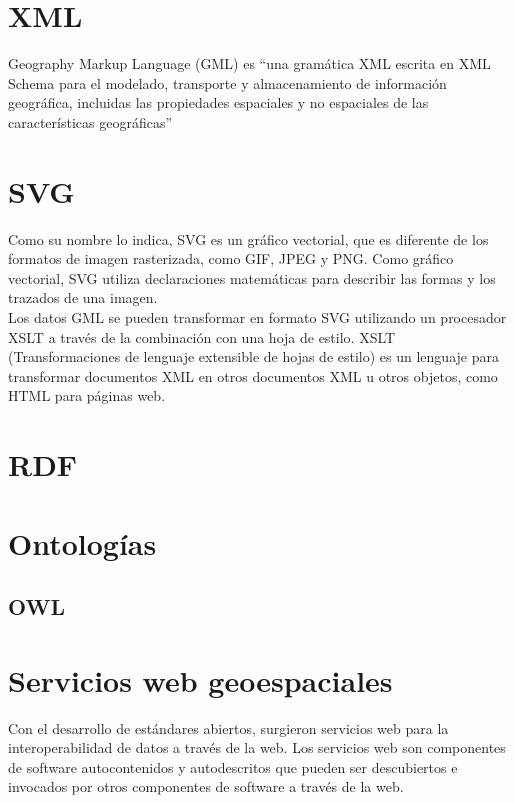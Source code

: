 \section{XML}

Geography Markup Language (GML) es “una gramática XML escrita en XML Schema para el modelado, transporte y almacenamiento de información geográfica, incluidas las propiedades espaciales y no espaciales de las características geográficas”

\section{SVG}

Como su nombre lo indica, SVG es un gráfico vectorial, que es diferente de los formatos de imagen rasterizada, como GIF, JPEG y PNG. Como gráfico vectorial, SVG utiliza declaraciones matemáticas para describir las formas y los trazados de una imagen.\\


Los datos GML se pueden transformar en formato SVG utilizando un procesador XSLT a través de la combinación con una hoja de estilo. XSLT (Transformaciones de lenguaje extensible de hojas de estilo) es un lenguaje para transformar documentos XML en otros documentos XML u otros objetos, como HTML para páginas web.


\section{RDF}

\section{Ontologías}

\subsection{OWL}


\section{Servicios web geoespaciales}

Con el desarrollo de estándares abiertos, surgieron servicios web para la interoperabilidad de datos a través de la web. Los servicios web son componentes de software autocontenidos y autodescritos que pueden ser descubiertos e invocados por otros componentes de software a través de la web.


